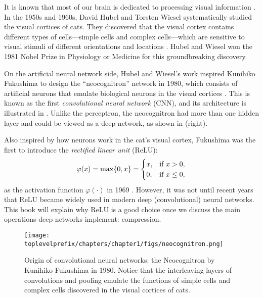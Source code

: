 \documentclass[../../book-main.tex]{subfiles}
\begin{document}
It is known that most of our brain is dedicated to processing visual information \cite{PalmerS1999}. In the 1950s and 1960s, David Hubel and Torsten Wiesel systematically studied the visual cortices of cats. They discovered that the visual cortex contains different types of cells---simple cells and complex cells---which are sensitive to visual stimuli of different orientations and locations \cite{Hubel-Wiesel-1959}. Hubel and Wiesel won the 1981 Nobel Prize in Physiology or Medicine for this groundbreaking discovery.

On the artificial neural network side, Hubel and Wiesel's work inspired Kunihiko Fukushima to design the ``neocognitron'' network in 1980, which consists of artificial neurons that emulate biological neurons in the visual cortices \cite{Fukushima1980NeocognitronAS}. This is known as the first \textit{convolutional neural network} (CNN), and its architecture is illustrated in . Unlike the perceptron, the neocognitron had more than one hidden layer and could be viewed as a deep network, as shown in  (right).

Also inspired by how neurons work in the cat's visual cortex, Fukushima was the first to introduce the \textit{rectified linear unit} (ReLU):
\begin{equation}
    \varphi(x) = \max\{0, x\} = \begin{cases}x, & \text{if } x > 0, \\ 0, & \text{if } x \leq 0,\end{cases}
\end{equation}
as the activation function \(\varphi(\cdot)\) in 1969 \cite{Fukushima-1969}. However, it was not until recent years that ReLU became widely used in modern deep (convolutional) neural networks. This book will explain why ReLU is a good choice once we discuss the main operations deep networks implement: compression.

\begin{figure}
    \centering
    \texttt{[image: \\toplevelprefix/chapters/chapter1/figs/neocognitron.png]}
    \caption{Origin of convolutional neural networks: the Neocognitron by Kunihiko Fukushima in 1980. Notice that the interleaving layers of convolutions and pooling emulate the functions of simple cells and complex cells discovered in the visual cortices of cats.}
    \label{fig:neocognitron}
\end{figure}
\end{document}
